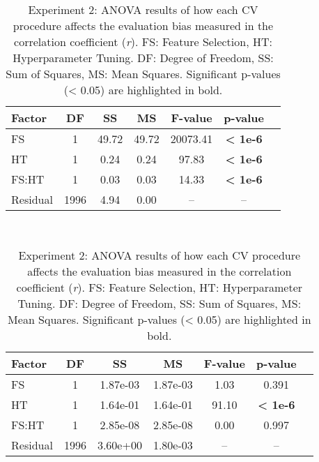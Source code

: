 \begin{table}[ht!]
    \centering
    \caption{Experiment 2: ANOVA results of how each CV procedure affects the evaluation bias measured in the correlation coefficient (\textit{r}). FS: Feature Selection, HT: Hyperparameter Tuning. DF: Degree of Freedom, SS: Sum of Squares, MS: Mean Squares. Significant p-values (< 0.05) are highlighted in bold.}
    \label{tab:anova_r}
    \begin{minipage}{\textwidth}
    \centering
    \begin{tabular}{lcccccc}
    \toprule
    \textbf{Factor} & \textbf{DF} & \textbf{SS}    & \textbf{MS}    & \textbf{F-value}    & \textbf{p-value}  \\
    \midrule
    FS        & 1    & 49.72  & 49.72  & 20073.41   & \textbf{< 1e-6} \\
    HT        & 1    & 0.24   & 0.24   & 97.83      & \textbf{< 1e-6} \\
    FS:HT     & 1    & 0.03   & 0.03   & 14.33      & \textbf{< 1e-6} \\
    Residual  & 1996 & 4.94   & 0.00   & --         & --     \\
    \bottomrule
    \end{tabular}
    \end{minipage}
    \\[1em]
    \begin{minipage}{\textwidth}
    \centering
    \begin{tabular}{lcccccc}
    \toprule
    \textbf{Factor} & \textbf{DF} & \textbf{SS}    & \textbf{MS}    & \textbf{F-value}    & \textbf{p-value}  \\
    \midrule
    FS        & 1    & 1.87e-03 & 1.87e-03 & 1.03  & 0.391  \\
    HT        & 1    & 1.64e-01 & 1.64e-01 & 91.10 & \textbf{< 1e-6}  \\
    FS:HT     & 1    & 2.85e-08 & 2.85e-08 & 0.00  & 0.997   \\
    Residual  & 1996 & 3.60e+00 & 1.80e-03 & --    & --      \\
    \bottomrule
    \end{tabular}
    \end{minipage}
    \\[1em]
    \begin{minipage}{\textwidth}
    \centering

\end{minipage}
\end{table}
